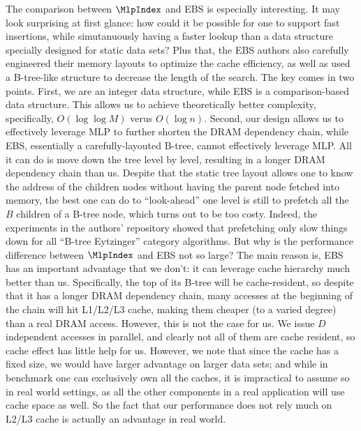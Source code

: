 \documentclass[11pt, usletter]{article}
\begin{document}
The comparison between $\MlpIndex$ and EBS is especially interesting. 
It may look surprising at first glance: how could it be possible for one to support fast insertions, 
while simutanuously having a faster lookup than a data structure specially designed for static data sets?
Plus that, the EBS authors also carefully engineered their memory layouts 
to optimize the cache efficiency, as well as used a B-tree-like structure to decrease the length of the search.
The key comes in two points. First, we are an integer data structure, while EBS is a comparison-based data structure. 
This allows us to achieve theoretically better complexity, specifically, $O(\log\log M)$ verus $O(\log n)$. 
Second, our design allows us to effectively leverage MLP to further shorten the DRAM dependency chain, 
while EBS, essentially a carefully-layouted B-tree, cannot effectively leverage MLP. 
All it can do is move down the tree level by level, resulting in a longer DRAM dependency chain than us. 
Despite that the static tree layout allows one to know the address of the children nodes without having 
the parent node fetched into memory, 
the best one can do to ``look-ahead'' one level is still to prefetch all the $B$ children of a B-tree node, 
which turns out to be too costy. Indeed, the experiments in the authors' repository 
showed that prefetching only slow things down for all ``B-tree Eytzinger'' category algorithms.
But why is the performance difference between $\MlpIndex$ and EBS not so large? 
The main reason is, EBS has an important advantage that we don't: it can leverage cache hierarchy much better than us. 
Specifically, the top of its B-tree will be cache-resident, 
so despite that it has a longer DRAM dependency chain, many accesses at the beginning of the chain will hit L1/L2/L3 
cache, making them cheaper (to a varied degree) than a real DRAM access. 
However, this is not the case for us. We issue $D$ independent accesses in parallel, 
and clearly not all of them are cache resident, so cache effect has little help for us.
However, we note that since the cache has a fixed size, we would have larger advantage on larger data sets; 
and while in benchmark one can exclusively own all the caches, it is impractical to assume so in real world settings,
as all the other components in a real application will use cache space as well. 
So the fact that our performance does not rely much on L2/L3 cache is actually an advantage in real world.
\end{document}
